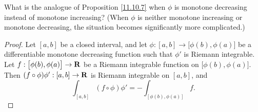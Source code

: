 \begin{exercise}\label{ex 11.10.4}
    What is the analogue of Proposition \ref{11.10.7} when \(\phi\) is monotone decreasing instead of monotone increasing?
    (When \(\phi\) is neither monotone increasing or monotone decreasing, the situation becomes significantly more complicated.)
\end{exercise}

\begin{proof}
    Let \([a, b]\) be a closed interval, and let \(\phi : [a, b] \to \big[\phi(b), \phi(a)\big]\) be a differentiable monotone decreasing function such that \(\phi'\) is Riemann integrable.
    Let \(f : \big[\phi(b), \phi(a)\big] \to \mathbf{R}\) be a Riemann integrable function on \(\big[\phi(b), \phi(a)\big]\).
    Then \((f \circ \phi) \phi' : [a, b] \to \mathbf{R}\) is Riemann integrable on \([a, b]\), and
    \[
        \int_{[a, b]} (f \circ \phi) \phi' = -\int_{[\phi(b), \phi(a)]} f.
    \]


\end{proof}
